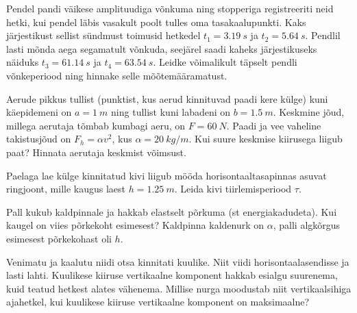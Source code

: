 \documentclass[10pt, twoside]{article}
\begin{document}
{
Pendel pandi väikese amplituudiga võnkuma ning stopperiga registreeriti neid hetki, kui pendel läbis vasakult poolt tulles oma tasakaalupunkti. Kaks järjestikust sellist sündmust toimusid hetkedel $t_1=\SI{3,19}{s}$ ja $t_2=\SI{5,64}{s}$. Pendlil lasti mõnda aega segamatult võnkuda, seejärel saadi kaheks järjestikuseks näiduks $t_3=\SI{61,14}{s}$ ja $t_4=\SI{63,54}{s}$. Leidke võimalikult täpselt pendli võnkeperiood ning hinnake selle mõõtemääramatust.
\probend
\bigskip


Aerude pikkus tullist (punktist, kus aerud kinnituvad paadi kere külge) kuni käepidemeni on $a = \SI{1}{m}$ ning tullist kuni labadeni on $b = \SI{1,5}{m}$. Keskmine jõud, millega aerutaja tõmbab kumbagi aeru, on $F = \SI{60}{N}$. Paadi ja vee vaheline takistusjõud on $F_h = \alpha v^2$, kus $\alpha = \SI{20}{kg/m}$. Kui suure keskmise kiirusega liigub paat? Hinnata aerutaja keskmist võimsust.
\probend
\bigskip


Paelaga lae külge kinnitatud kivi liigub mööda horisontaaltasapinnas asuvat ringjoont, mille kaugus laest $h = \SI{1,25}{m}$. Leida kivi tiirlemisperiood $\tau$.
\probend
\bigskip


Pall kukub kaldpinnale ja hakkab elastselt põrkuma (st energiakadudeta). Kui kaugel on viies põrkekoht esimesest? Kaldpinna kaldenurk on $\alpha$, palli algkõrgus esimesest põrkekohast oli $h$.
\probend
\bigskip


Venimatu ja kaalutu niidi otsa kinnitati kuulike.
Niit viidi horisontaalasendisse ja lasti lahti. Kuulikese kiiruse vertikaalne komponent
hakkab esialgu suurenema, kuid teatud hetkest alates vähenema. Millise nurga moodustab niit vertikaalsihiga ajahetkel, kui kuulikese kiiruse vertikaalne komponent on
maksimaalne?
\probend
\bigskip


}
\end{document}
